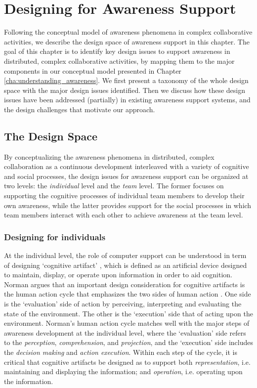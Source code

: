 \graphicspath{{Figures/}}

\chapter{Designing for Awareness Support} %
\label{cha:designing_for_awareness_support}
Following the conceptual model of awareness phenomena in complex collaborative activities, we describe the design space of awareness support in this chapter. The goal of this chapter is to identify key design issues to support awareness in distributed, complex collaborative activities, by mapping them to the major components in our conceptual model presented in Chapter \ref{cha:understanding_awareness}. We first present a taxonomy of the whole design space with the major design issues identified. Then we discuss how these design issues have been addressed (partially) in existing awareness support systems, and the design challenges that motivate our approach. 

\section{The Design Space} %
\label{sec:the_design_space}
By conceptualizing the awareness phenomena in distributed, complex collaboration as a continuous development interleaved with a variety of cognitive and social processes, the design issues for awareness support can be organized at two levels: the \emph{individual} level and the \emph{team} level. The former focuses on supporting the cognitive processes of individual team members to develop their own awareness, while the latter provides support for the social processes in which team members interact with each other to achieve awareness at the team level.

\subsection{Designing for individuals} %
\label{sub:designing_for_individuals}
At the individual level, the role of computer support can be understood in term of designing `cognitive artifact' \cite{Norman1992}, which is defined as an artificial device designed to maintain, display, or operate upon information in order to aid cognition. Norman argues that an important design consideration for cognitive artifacts is the human action cycle that emphasizes the two sides of human action \cite{Norman1992}. One side is the `evaluation' side of action by perceiving, interpreting and evaluating the state of the environment. The other is the `execution' side that of acting upon the environment. Norman's human action cycle matches well with the major steps of awareness development at the individual level, where the `evaluation' side refers to the \emph{perception}, \emph{comprehension}, and \emph{projection}, and the `execution' side includes the \emph{decision making} and \emph{action execution}. Within each step of the cycle, it is critical that cognitive artifacts be designed as to support both \emph{representation}, i.e. maintaining and displaying the information; and \emph{operation}, i.e. operating upon the information.


